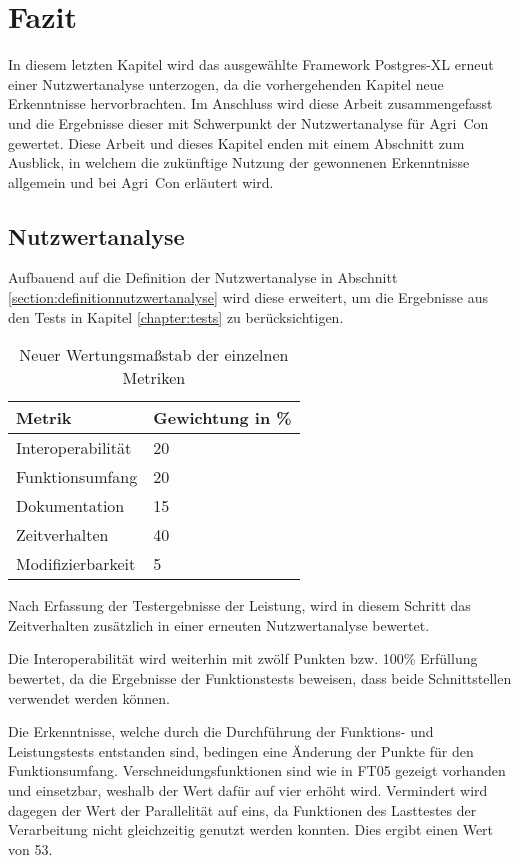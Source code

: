 \chapter{Fazit}
In diesem letzten Kapitel wird das ausgewählte Framework Postgres-XL erneut einer Nutzwertanalyse unterzogen, da die vorhergehenden Kapitel neue Erkenntnisse hervorbrachten.
Im Anschluss wird diese Arbeit zusammengefasst und die Ergebnisse dieser mit Schwerpunkt der Nutzwertanalyse für Agri~Con gewertet.
Diese Arbeit und dieses Kapitel enden mit einem Abschnitt zum Ausblick, in welchem die zukünftige Nutzung der gewonnenen Erkenntnisse allgemein und bei Agri~Con erläutert wird.

\section{Nutzwertanalyse}
Aufbauend auf die Definition der Nutzwertanalyse in Abschnitt \ref{section:definitionnutzwertanalyse} wird diese erweitert, um die Ergebnisse aus den Tests in Kapitel \ref{chapter:tests} zu berücksichtigen.

\begin{table}[h!]
\centering
\begin{tabular}{l|l}
\textbf{Metrik} & \textbf{Gewichtung in \%} \\ \hline
Interoperabilität & 20 \\ \hline
Funktionsumfang & 20 \\ \hline
Dokumentation & 15 \\ \hline
Zeitverhalten & 40 \\ \hline
Modifizierbarkeit & 5
\end{tabular}
\caption{Neuer Wertungsmaßstab der einzelnen Metriken}
\label{table:Wertungsmassstab2}
\end{table}
Nach Erfassung der Testergebnisse der Leistung, wird in diesem Schritt das Zeitverhalten zusätzlich in einer erneuten Nutzwertanalyse bewertet.

Die Interoperabilität wird weiterhin mit zwölf Punkten bzw. 100\%{} Erfüllung bewertet, da die Ergebnisse der Funktionstests beweisen, dass beide Schnittstellen verwendet werden können.

Die Erkenntnisse, welche durch die Durchführung der Funktions- und Leistungstests entstanden sind, bedingen eine Änderung der Punkte für den Funktionsumfang.
Verschneidungsfunktionen sind wie in FT05 gezeigt vorhanden und einsetzbar, weshalb der Wert dafür auf vier erhöht wird.
Vermindert wird dagegen der Wert der Parallelität auf eins, da Funktionen des Lasttestes der Verarbeitung nicht gleichzeitig genutzt werden konnten.
Dies ergibt einen Wert von 53.

